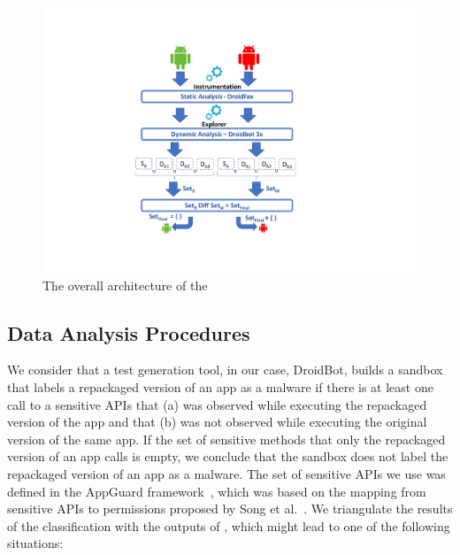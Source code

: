 

\begin{figure}[h]
  \includegraphics[width=\columnwidth]{images/mineSandbox.pdf}
  \caption{The overall architecture of the \mas}
  \label{fig:mas}
\end{figure}


\subsection{Data Analysis Procedures} \label{sec:dataAnalysisProc}



We consider that a test
generation tool, in our case, DroidBot, builds a sandbox that labels a repackaged version
of an app as a malware if there is at least one call to a sensitive APIs that (a) was observed
while executing the repackaged version of the app and that (b) was not observed while
executing the original version of the same app. If the set of sensitive methods that only the repackaged version of an app calls is empty,
we conclude that the sandbox does not label the repackaged version of an app as a malware. The set of sensitive APIs we use was defined in the AppGuard framework~\cite{DBLP:conf/esorics/BackesGHMS13}, which was based on the mapping from sensitive APIs to permissions proposed by Song et al.~\cite{DBLP:conf/ccs/FeltCHSW11}. We triangulate
the results of the \mas classification with the outputs of \vt, which might lead to one of the following
situations:


